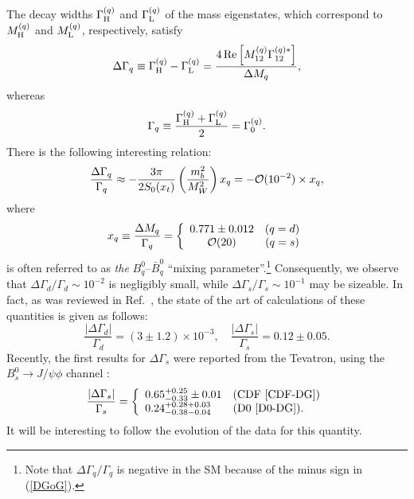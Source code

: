 \documentclass[12pt]{article}
\begin{document}
The decay widths $\Gamma_{\rm H}^{(q)}$ and 
$\Gamma_{\rm L}^{(q)}$ of the mass eigenstates, which correspond to 
$M^{(q)}_{\rm H}$ and $M^{(q)}_{\rm L}$, respectively, satisfy 
\begin{equation}
\Delta\Gamma_q\equiv\Gamma_{\rm H}^{(q)}-\Gamma_{\rm L}^{(q)}=
\frac{4\mbox{\,Re}\left[M_{12}^{(q)}\Gamma_{12}^{(q)\ast}\right]}{\Delta M_q},
\end{equation}
whereas 
\begin{equation}
\Gamma_q\equiv\frac{\Gamma^{(q)}_{\rm H}+\Gamma^{(q)}_{\rm L}}{2}=
\Gamma^{(q)}_0.
\end{equation}
There is the following interesting relation:
\begin{equation}\label{DGoG}
\frac{\Delta\Gamma_q}{\Gamma_q}\approx-\frac{3\pi}{2S_0(x_t)}
\left(\frac{m_b^2}{M_W^2}\right)x_q=-{\cal O}(10^{-2})\times x_q,
\end{equation}
where
\begin{equation}\label{mix-par}
x_q\equiv\frac{\Delta M_q}{\Gamma_q}=\left\{\begin{array}{cc}
0.771\pm0.012&(q=d)\\
{\cal O}(20)& (q=s)
\end{array}\right.
\end{equation}
is often referred to as {\it the} 
$B^0_q$--$\bar B^0_q$ ``mixing parameter''.\footnote{Note that
$\Delta\Gamma_q/\Gamma_q$ is negative in the SM because of the
minus sign in (\ref{DGoG}).}
Consequently, we observe that $\Delta\Gamma_d/\Gamma_d\sim 10^{-2}$ is 
negligibly small, while $\Delta\Gamma_s/\Gamma_s\sim 10^{-1}$ may
be sizeable. In fact, as was reviewed in Ref.~\cite{lenz}, the 
state of the art of calculations of these quantities is given as follows:
\begin{equation}\label{DGam-numbers}
\frac{|\Delta\Gamma_d|}{\Gamma_d}=(3\pm1.2)\times 10^{-3}, \quad
\frac{|\Delta\Gamma_s|}{\Gamma_s}=0.12\pm0.05.
\end{equation}
Recently, the first results for 
$\Delta\Gamma_s$ were reported from the Tevatron, using the 
$B^0_s\to J/\psi\phi$ channel \cite{DDF}:
\begin{equation}
\frac{|\Delta\Gamma_s|}{\Gamma_s}=\left\{
\begin{array}{ll}
0.65^{+0.25}_{-0.33}\pm0.01 & \mbox{(CDF \cite{CDF-DG})}\\
0.24^{+0.28+0.03}_{-0.38-0.04} & \mbox{(D0 \cite{D0-DG})}.
\end{array}
\right.
\end{equation}
It will be interesting to follow the evolution of the data for this quantity. 
\end{document}
